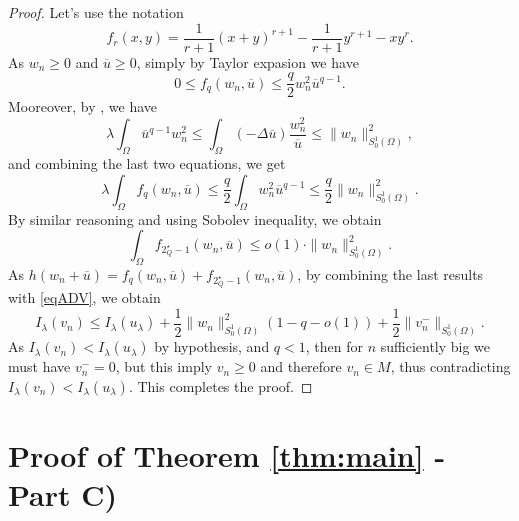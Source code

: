 \documentclass[11pt]{amsart}
\numberwithin{equation}{section} %
\theoremstyle{definition}
\begin{document}
\begin{proof}
	Let's use the notation
	\[
	f_r(x,y)=\frac{1}{r+1}(x+y)^{r+1}-\frac{1}{r+1}y^{r+1}-xy^r.
	\]
	As $w_n\geq0$ and $\overline u\geq0$, simply
	by Taylor expasion we have
	\begin{equation}\label{tayq}
		0\leq f_{q}(w_n,\overline u)\leq \frac{q}{2}w_n^2\overline u^{q-1}.
	\end{equation}
		Mooreover, by \cite[Theorem 3.4]{Ruzhansky_Suragan}, we have 
	\begin{equation}\label{picone}
		 \lambda\int_\Omega \overline u^{q-1}w_n^2\leq \int_\Omega (-\Delta \overline u)\frac{w_n^2}{\overline u}\leq \|w_n\|_{S_{0}^{1}(\Omega)}^2,
	\end{equation}
	and combining the last two equations, we get
	\begin{equation}\label{combq}
		\lambda\int_\Omega f_q(w_n,\overline u)\leq \frac{q}{2}\int_\Omega w_n^2\overline u^{q-1}\leq \frac{q}{2}\|w_n\|_{S_{0}^{1}(\Omega)}^2.
	\end{equation}
 	By similar reasoning and using Sobolev inequality, we obtain
 \begin{equation}
 	\int_\Omega f_{2^\star_Q-1}(w_n,\overline u)\leq o(1)\cdot \|w_n\|_{S_{0}^{1}(\Omega)}^2.
 \end{equation}
 As $h(w_n+\overline u)=f_q(w_n,\overline u)+f_{2^\star_Q-1}(w_n,\overline u)$, 
 by combining the last results with \eqref{eqADV},
 we obtain
 \[
 I_\lambda(v_n)\leq I_\lambda(u_\lambda)+\frac{1}{2}\|w_n\|_{S_{0}^{1}(\Omega)}^2(1-q-o(1))+\frac{1}{2}\|v_n^-\|_{S_{0}^{1}(\Omega)}.
 \]
 As $I_\lambda(v_n)<I_\lambda(u_\lambda)$ by hypothesis,
 and $q<1$, then for $n$ sufficiently big we must have $v_n^-=0$,
 but this imply $v_n\geq0$ and therefore $v_n\in M$,
 thus contradicting $I_\lambda(v_n)<I_\lambda(u_\lambda)$.
 This completes the proof.	\end{proof}
\medskip

\color{black}



\medskip


\section{Proof of Theorem \ref{thm:main} - Part C)}\label{sec:Second_Solution}
\end{document}
